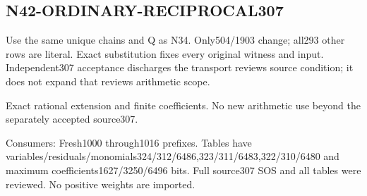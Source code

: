 \documentclass{article}
\begin{document}
\subsection{N42-ORDINARY-RECIPROCAL307}
\label{outline:r5-n42-ordinary-reciprocal307}
Use the same unique chains and Q as N34. Only504/1903 change; all293 other rows are literal. Exact substitution fixes every original witness and input. Independent307 acceptance discharges the transport reviews source condition; it does not expand that reviews arithmetic scope.
\par Exact rational extension and finite coefficients. No new arithmetic use beyond the separately accepted source307.
\par Consumers: Fresh1000 through1016 prefixes. Tables have variables/residuals/monomials324/312/6486,323/311/6483,322/310/6480 and maximum coefficients1627/3250/6496 bits. Full source307 SOS and all tables were reviewed. No positive weights are imported.
\end{document}
